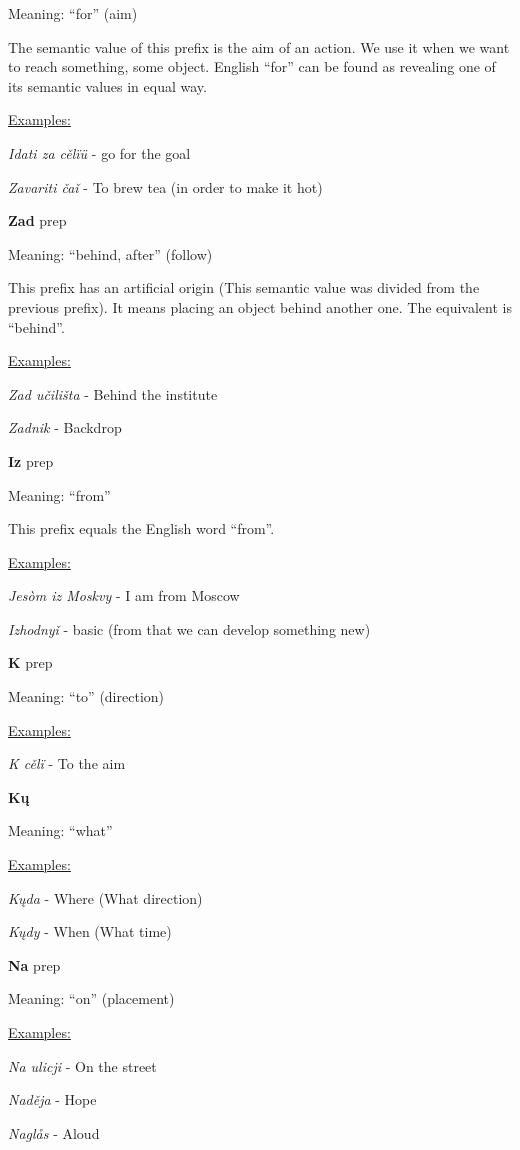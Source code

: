 Meaning: “for” (aim)

The semantic value of this prefix is the aim of an action. We use it when we want to reach something, some object. English “for” can be found as revealing one of its semantic values in equal way. 

\underline{Examples:}

\textit{Idati za cělïü} - go for the goal

\textit{Zavariti čaǐ }- To brew tea (in order to make it hot)

\textbf{Zad} \gls{prep}

Meaning: “behind, after” (follow)

This prefix has an artificial origin (This semantic value was divided from the previous prefix). It means placing an object behind another one. The equivalent is “behind”.

\underline{Examples:}

\textit{Zad učilišta} - Behind the institute

\textit{Zadnik} - Backdrop

\textbf{Iz} \gls{prep}

Meaning: “from”

This prefix equals the English word “from”. 

\underline{Examples:}

\textit{Jesòm iz Moskvy} - I am from Moscow

\textit{Izhodnyǐ} - basic (from that we can develop something new)

\textbf{K} \gls{prep}

Meaning: “to” (direction)

\underline{Examples:}

\textit{K cělï} - To the aim



\textbf{Kų}

Meaning: “what”

\underline{Examples:}

\textit{Kųda} - Where (What direction)

\textit{Kųdy} - When (What time) 

\textbf{Na} \gls{prep}

Meaning: “on” (placement)

\underline{Examples:}

\textit{Na ulicji} - On the street

\textit{Naděja} - Hope

\textit{Naglås} - Aloud


